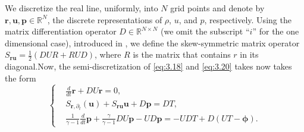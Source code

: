 We discretize the real line, uniformly, into $N$ grid points and denote by $\mathbf r, \mathbf u, \mathbf p \in \mathbb R^{N}$, the discrete representations of $\rho$, $u$, and $p$, respectively. Using the matrix differentiation operator $D\in \mathbb R^{N\times N}$ (we omit the subscript ``$i$'' for the one dimensional case), introduced in , we define the skew-symmetric matrix operator $S_{\mathbf r \mathbf u} = \frac 1 2 (DUR + RUD)$, where $R$ is the matrix that contains $r$ in its diagonal.Now, the semi-discretization of \eqref{eq:3.18} and \eqref{eq:3.20} takes now takes the form
\begin{equation} \label{eq:3.21}
\left\{
\begin{aligned}
	& \frac{d}{dt} \mathbf r + DU\mathbf r = 0, \\
	& S_{\mathbf r,\partial_t} (\mathbf u) + S_{\mathbf r \mathbf u} \mathbf u + D \mathbf p = D T, \\
	&\frac{1}{\gamma -1} \frac{d}{dt} \mathbf p + \frac{\gamma}{\gamma -1} D U \mathbf p - UD\mathbf p = - UDT + D(UT - \mathbf \phi).
\end{aligned}
\right.
\end{equation}

